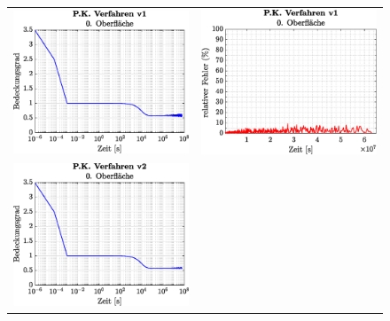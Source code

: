 \documentclass{listhesis}
\begin{document}
\begin{figure}[!h]
\begin{tabular}{@{}cc@{}}
\includegraphics[width=\wss\textwidth]{./include/figure_3.5/PC_current/CovFacet0.eps}&
\includegraphics[width=\wss\textwidth]{./include/figure_3.5/PC_current/CovFacetError0.eps}\\
\includegraphics[width=\wss\textwidth]{./include/figure_3.5/PC_new/CovFacet0.eps}&

\end{tabular}
\end{figure}
\end{document}
